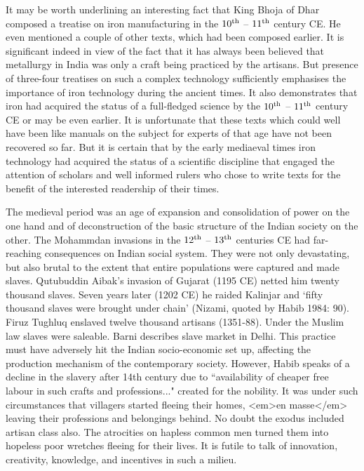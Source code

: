 It may be worth underlining an interesting fact that King Bhoja of Dhar composed a treatise on iron manufacturing in the $10^{\rm th}$ – $11^{\rm th}$ century CE. He even mentioned a couple of other texts, which had been composed earlier. It is significant indeed in view of the fact that it has always been believed that metallurgy in India was only a craft being practiced by the artisans. But presence of three-four treatises on such a complex technology sufficiently emphasises the importance of iron technology during the ancient times. It also demonstrates that iron had acquired the status of a full-fledged science by the $10^{\rm th}$ – $11^{\rm th}$ century CE or may be even earlier. It is unfortunate that these texts which could well have been like manuals on the subject for experts of that age have not been recovered so far. But it is certain that by the early mediaeval times iron technology had acquired the status of a scientific discipline that engaged the attention of scholars and well informed rulers who chose to write texts for the benefit of the interested readership of their times.

The medieval period was an age of expansion and consolidation of power on the one hand and of deconstruction of the basic structure of the Indian society on the other. The Mohammdan invasions in the $12^{\rm th}$ – $13^{\rm th}$ centuries CE had far-reaching consequences on Indian social system. They were not only devastating, but also brutal to the extent that entire populations were captured and made slaves. Qutubuddin Aibak's invasion of Gujarat (1195 CE) netted him twenty thousand slaves. Seven years later (1202 CE) he raided Kalinjar and ‘fifty thousand slaves were brought under chain' (Nizami, quoted by Habib 1984: 90). Firuz Tughluq enslaved twelve thousand artisans (1351-88). Under the Muslim law slaves were saleable. Barni describes slave market in Delhi. This practice must have adversely hit the Indian socio-economic set up, affecting the production mechanism of the contemporary society. However, Habib speaks of a decline in the slavery after 14th century due to ``availability of cheaper free labour in such crafts and professions..." created for the nobility. It was under such circumstances that villagers started fleeing their homes, <em>en masse</em> leaving their professions and belongings behind. No doubt the exodus included artisan class also. The atrocities on hapless common men turned them into hopeless poor wretches fleeing for their lives. It is futile to talk of innovation, creativity, knowledge, and incentives in such a milieu. 

